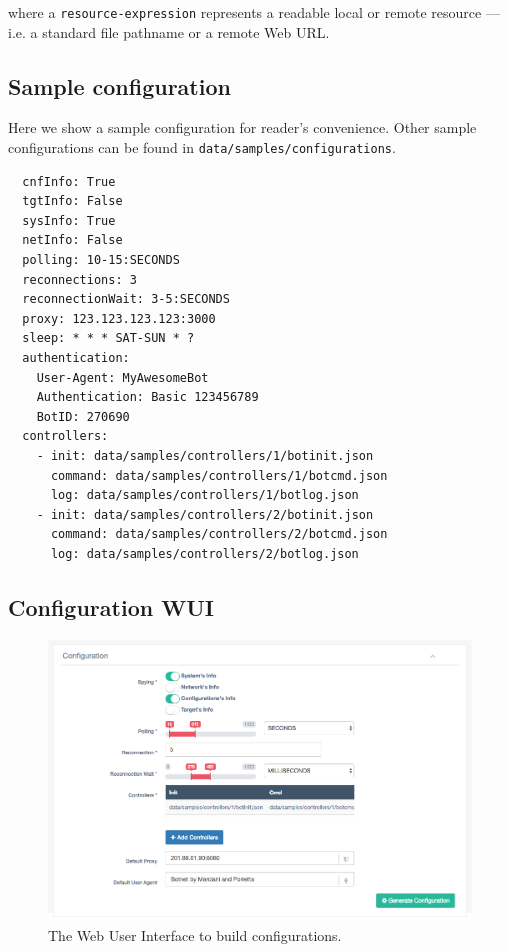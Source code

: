 where a \texttt{resource-expression} represents a readable local or remote resource — i.e. a standard file pathname or a remote Web URL.

\subsection{Sample configuration}
\label{sec:sample-configuration}

Here we show a sample configuration for reader's convenience. Other sample configurations can be found in \texttt{data/samples/configurations}.

\begin{verbatim}
  cnfInfo: True
  tgtInfo: False
  sysInfo: True
  netInfo: False
  polling: 10-15:SECONDS
  reconnections: 3
  reconnectionWait: 3-5:SECONDS
  proxy: 123.123.123.123:3000
  sleep: * * * SAT-SUN * ?
  authentication:
    User-Agent: MyAwesomeBot
    Authentication: Basic 123456789
    BotID: 270690
  controllers:
    - init: data/samples/controllers/1/botinit.json
      command: data/samples/controllers/1/botcmd.json
      log: data/samples/controllers/1/botlog.json
    - init: data/samples/controllers/2/botinit.json
      command: data/samples/controllers/2/botcmd.json
      log: data/samples/controllers/2/botlog.json
\end{verbatim}

\subsection{Configuration WUI}\label{sec:configuration-wui}


\begin{figure}[tp]
  \centering
  \includegraphics[scale=0.45]{./fig/configurationWUI.png}
  \caption{The Web User Interface to build configurations.}
    \label{fig:configuration-wui}
\end{figure}

\textcolor{green}{\lipsum[1]}
